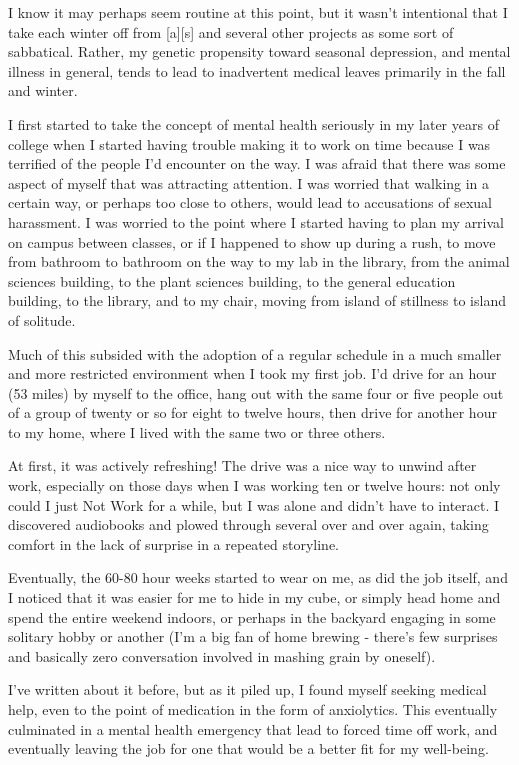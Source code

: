 I know it may perhaps seem routine at this point, but it wasn't
intentional that I take each winter off from {[}a{]}{[}s{]} and several
other projects as some sort of sabbatical. Rather, my genetic propensity
toward seasonal depression, and mental illness in general, tends to lead
to inadvertent medical leaves primarily in the fall and winter.

I first started to take the concept of mental health seriously in my
later years of college when I started having trouble making it to work
on time because I was terrified of the people I'd encounter on the way.
I was afraid that there was some aspect of myself that was attracting
attention. I was worried that walking in a certain way, or perhaps too
close to others, would lead to accusations of sexual harassment. I was
worried to the point where I started having to plan my arrival on campus
between classes, or if I happened to show up during a rush, to move from
bathroom to bathroom on the way to my lab in the library, from the
animal sciences building, to the plant sciences building, to the general
education building, to the library, and to my chair, moving from island
of stillness to island of solitude.

Much of this subsided with the adoption of a regular schedule in a much
smaller and more restricted environment when I took my first job. I'd
drive for an hour (53 miles) by myself to the office, hang out with the
same four or five people out of a group of twenty or so for eight to
twelve hours, then drive for another hour to my home, where I lived with
the same two or three others.

At first, it was actively refreshing! The drive was a nice way to unwind
after work, especially on those days when I was working ten or twelve
hours: not only could I just Not Work for a while, but I was alone and
didn't have to interact. I discovered audiobooks and plowed through
several over and over again, taking comfort in the lack of surprise in a
repeated storyline.

Eventually, the 60-80 hour weeks started to wear on me, as did the job
itself, and I noticed that it was easier for me to hide in my cube, or
simply head home and spend the entire weekend indoors, or perhaps in the
backyard engaging in some solitary hobby or another (I'm a big fan of
home brewing - there's few surprises and basically zero conversation
involved in mashing grain by oneself).

I've written about it before, but as it piled up, I found myself seeking
medical help, even to the point of medication in the form of
anxiolytics. This eventually culminated in a mental health emergency
that lead to forced time off work, and eventually leaving the job for
one that would be a better fit for my well-being.

